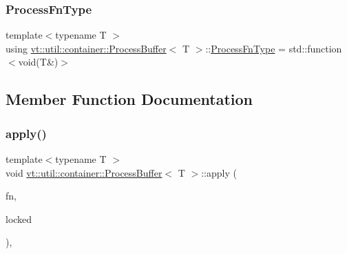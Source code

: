 \subsubsection{\texorpdfstring{Process\+Fn\+Type}{ProcessFnType}}
{\footnotesize\ttfamily template$<$typename T $>$ \\
using \hyperlink{structvt_1_1util_1_1container_1_1_process_buffer}{vt\+::util\+::container\+::\+Process\+Buffer}$<$ T $>$\+::\hyperlink{structvt_1_1util_1_1container_1_1_process_buffer_a20be3480fb453096015a6fe5ca370816}{Process\+Fn\+Type} =  std\+::function$<$void(T\&)$>$}



\subsection{Member Function Documentation}
\mbox{\label{structvt_1_1util_1_1container_1_1_process_buffer_a92dc3217faf1e869406094e875e6a68b}} 
\subsubsection{\texorpdfstring{apply()}{apply()}}
{\footnotesize\ttfamily template$<$typename T $>$ \\
void \hyperlink{structvt_1_1util_1_1container_1_1_process_buffer}{vt\+::util\+::container\+::\+Process\+Buffer}$<$ T $>$\+::apply (\begin{DoxyParamCaption}\item[{\hyperlink{structvt_1_1util_1_1container_1_1_process_buffer_a20be3480fb453096015a6fe5ca370816}{Process\+Fn\+Type}}]{fn,  }\item[{bool}]{locked }\end{DoxyParamCaption})\hspace{0.3cm}{\ttfamily [inline]}, {\ttfamily [private]}}

\mbox{\label{structvt_1_1util_1_1container_1_1_process_buffer_ab8b25ce1820da72a1770778252dabfea}} 
